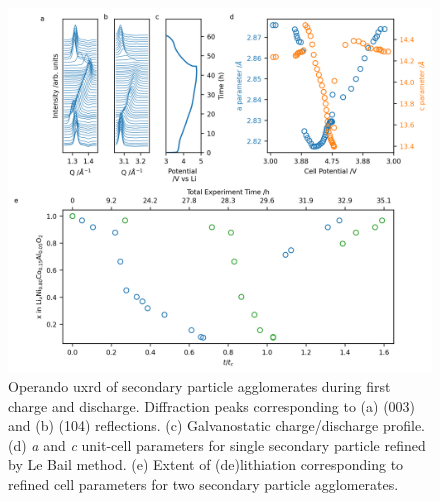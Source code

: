 \documentclass{article}
\begin{document}
\begin{figure}[!h]
  \includegraphics{figures/NCA_xrd.png}
  \caption{ Operando \gls{uxrd} of \nca{} secondary particle
    agglomerates during first charge and discharge. Diffraction peaks
    corresponding to (a) (003) and (b) (104) reflections. (c)
    Galvanostatic charge/discharge profile. (d) \textit{a} and
    \textit{c} unit-cell parameters for single secondary particle
    refined by Le Bail method. (e) Extent of (de)lithiation
    corresponding to refined cell parameters\cite{robert2015} for two
    secondary particle agglomerates.}
  \label{fig:uxrd}
\end{figure}
\end{document}
